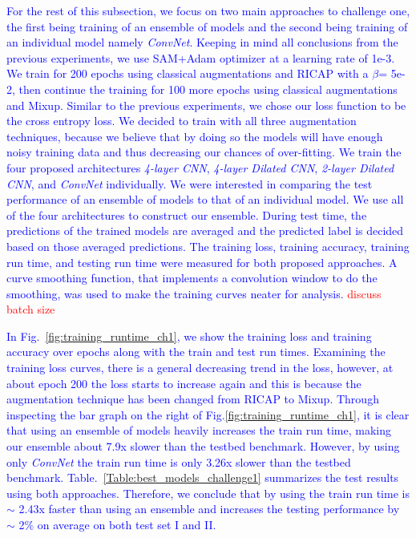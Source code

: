 \documentclass[a4paper,11pt]{article}
\begin{document}
\textcolor{blue}{For the rest of this subsection, we focus on two main approaches to challenge one, the first being training of an ensemble of models and the second being training of an individual model namely \textit{ConvNet}. Keeping in mind all conclusions from the previous experiments, we use SAM+Adam optimizer at a learning rate of 1e-3. We train for 200 epochs using classical augmentations and RICAP with a $\beta$= 5e-2, then continue the training for 100 more epochs using classical augmentations and Mixup. Similar to the previous experiments, we chose our loss function to be the cross entropy loss. We decided to train with all three augmentation techniques, because we believe that by doing so the models will have enough noisy training data and thus decreasing our chances of over-fitting. We train the four proposed architectures \textit{4-layer CNN}, \textit{4-layer Dilated CNN}, \textit{2-layer Dilated CNN}, and \textit{ConvNet} individually. We were interested in comparing the test performance of an ensemble of models to that of an individual model. We use all of the four architectures to construct our ensemble. During test time, the predictions of the trained models are averaged and the predicted label is decided based on those averaged predictions. The training loss, training accuracy, training run time, and testing run time were measured for both proposed approaches. A curve smoothing function, that implements a convolution window to do the smoothing, was used to make the training curves neater for analysis.} \textcolor{red}{discuss batch size}

\textcolor{blue}{In Fig.~\ref{fig:training_runtime_ch1}, we show the training loss and training accuracy over epochs along with the train and test run times. Examining the training loss curves, there is a general decreasing trend in the loss, however, at about epoch 200 the loss starts to increase again and this is because the augmentation technique has been changed from RICAP to Mixup. Through inspecting the bar graph on the right of Fig.\ref{fig:training_runtime_ch1}, it is clear that using an ensemble of models heavily increases the train run time, making our ensemble about 7.9x slower than the testbed benchmark. However, by using only \textit{ConvNet} the train run time is only 3.26x slower than the testbed benchmark. Table.~\ref{Table:best_models_challenge1} summarizes the test results using both approaches. Therefore, we conclude that by using  the train run time is $\sim$ 2.43x faster than using an ensemble and increases the testing performance by $\sim$ 2\% on average on both test set I and II.}
\end{document}
